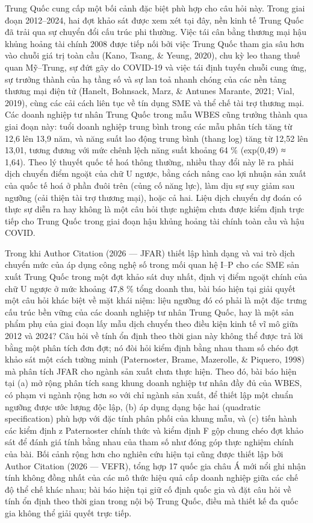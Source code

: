 \documentclass[12pt,a4paper]{article}
\begin{document}
Trung Quốc cung cấp một bối cảnh đặc biệt phù hợp cho câu hỏi này. Trong
giai đoạn 2012--2024, hai đợt khảo sát được xem xét tại đây, nền kinh tế
Trung Quốc đã trải qua sự chuyển đổi cấu trúc phi thường. Việc tái cân
bằng thương mại hậu khủng hoảng tài chính 2008 được tiếp nối bởi việc
Trung Quốc tham gia sâu hơn vào chuỗi giá trị toàn cầu (Kano, Tsang, \&
Yeung, 2020), chu kỳ leo thang thuế quan Mỹ--Trung, sự đứt gãy do
COVID-19 và việc tái định tuyến chuỗi cung ứng, sự trưởng thành của hạ
tầng số và sự lan toả nhanh chóng của các nền tảng thương mại điện tử
(Hanelt, Bohnsack, Marz, \& Antunes Marante, 2021; Vial, 2019), cùng các
cải cách liên tục về tín dụng SME và thể chế tài trợ thương mại. Các
doanh nghiệp tư nhân Trung Quốc trong mẫu WBES cũng trưởng thành qua
giai đoạn này: tuổi doanh nghiệp trung bình trong các mẫu phân tích tăng
từ 12,6 lên 13,9 năm, và năng suất lao động trung bình (thang log) tăng
từ 12,52 lên 13,01, tương đương với mức chênh lệch năng suất khoảng 64
\% (exp(0,49) ≈ 1,64). Theo lý thuyết quốc tế hoá thông thường, nhiều
thay đổi này lẽ ra phải dịch chuyển điểm ngoặt của chữ U ngược, bằng
cách nâng cao lợi nhuận sản xuất của quốc tế hoá ở phần đuôi trên (củng
cố năng lực), làm dịu sự suy giảm sau ngưỡng (cải thiện tài trợ thương
mại), hoặc cả hai. Liệu dịch chuyển dự đoán có thực sự diễn ra hay không
là một câu hỏi thực nghiệm chưa được kiểm định trực tiếp cho Trung Quốc
trong giai đoạn hậu khủng hoảng tài chính toàn cầu và hậu COVID.

Trong khi Author Citation (2026 --- JFAR) thiết lập hình dạng và vai trò
dịch chuyển mức của áp dụng công nghệ số trong mối quan hệ I--P cho các
SME sản xuất Trung Quốc trong một đợt khảo sát duy nhất, định vị điểm
ngoặt chính của chữ U ngược ở mức khoảng 47,8 \% tổng doanh thu, bài báo
hiện tại giải quyết một câu hỏi khác biệt về mặt khái niệm: liệu ngưỡng
đó có phải là một đặc trưng cấu trúc bền vững của các doanh nghiệp tư
nhân Trung Quốc, hay là một sản phẩm phụ của giai đoạn lấy mẫu dịch
chuyển theo điều kiện kinh tế vĩ mô giữa 2012 và 2024? Câu hỏi về tính
ổn định theo thời gian này không thể được trả lời bằng một phân tích đơn
đợt; nó đòi hỏi kiểm định bằng nhau tham số chéo đợt khảo sát một cách
tường minh (Paternoster, Brame, Mazerolle, \& Piquero, 1998) mà phân
tích JFAR cho ngành sản xuất chưa thực hiện. Theo đó, bài báo hiện tại
(a) mở rộng phân tích sang khung doanh nghiệp tư nhân đầy đủ của WBES,
có phạm vi ngành rộng hơn so với chỉ ngành sản xuất, để thiết lập một
chuẩn ngưỡng được ước lượng độc lập, (b) áp dụng dạng bậc hai (quadratic
specification) phù hợp với đặc tính phân phối của khung mẫu, và (c) tiến
hành các kiểm định z Paternoster chính thức và kiểm định F gộp chung
chéo đợt khảo sát để đánh giá tính bằng nhau của tham số như đóng góp
thực nghiệm chính của bài. Bối cảnh rộng hơn cho nghiên cứu hiện tại
cũng được thiết lập bởi Author Citation (2026 --- VEFR), tổng hợp 17
quốc gia châu Á mới nổi ghi nhận tính không đồng nhất của các mô thức
hiệu quả cấp doanh nghiệp giữa các chế độ thể chế khác nhau; bài báo
hiện tại giữ cố định quốc gia và đặt câu hỏi về tính ổn định theo thời
gian trong nội bộ Trung Quốc, điều mà thiết kế đa quốc gia không thể
giải quyết trực tiếp.
\end{document}
